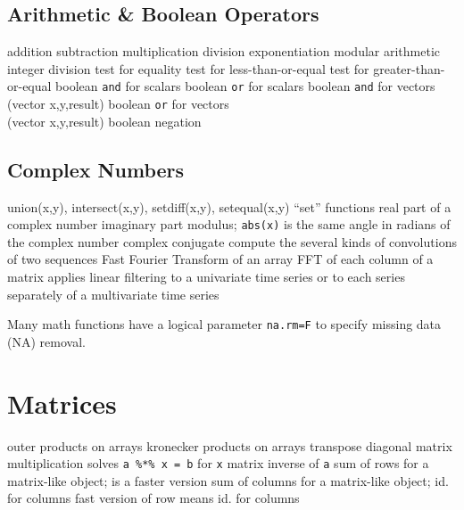 \subsection{Arithmetic \& Boolean Operators}{}
	{addition}
	{subtraction}
	{multiplication}
	{division}
	{exponentiation}
	{modular arithmetic}
	{integer division}
	{test for equality}
	{test for less-than-or-equal}
	{test for greater-than-or-equal}
	{boolean {\tt and} for scalars}
	{boolean {\tt or} for scalars}
	{boolean {\tt and} for vectors (vector x,y,result)}
	{boolean {\tt or} for vectors\\(vector x,y,result)}
	{boolean negation}

\subsection{Complex Numbers}{{\smalltt union(x,y),  intersect(x,y),  setdiff(x,y),  setequal(x,y)}}
	{``set'' functions}
	{real part of a complex number}
	{imaginary part}
	{modulus; {\tt abs(x)} is the same}
	{angle in radians of the complex number}
	{complex conjugate}
	{compute the several kinds of convolutions of two sequences}
	{Fast Fourier Transform of an array}
	{FFT of each column of a matrix}
	{applies linear filtering to a univariate time series or to each series separately of a multivariate time series}

Many math functions have a logical parameter {\tt na.rm=F} to
specify missing data (NA) removal.

\section{Matrices}{}

	{outer products on arrays}
	{kronecker products on arrays}
	{transpose}
	{diagonal}
\cmdS{\%*\%}	{matrix multiplication}
	{solves {\tt a \%*\% x = b} for {\tt x}}
	{matrix inverse of {\tt a}}
	{sum of rows for a matrix-like object;}
	{is a faster version}
	{sum of columns for a matrix-like object;}
	{id. for columns}
	{fast version of row means}
	{id. for columns}


